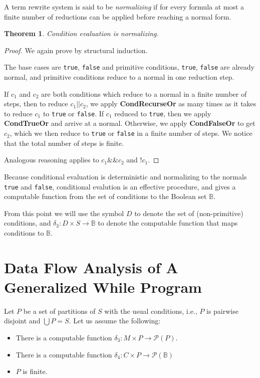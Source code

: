 \documentclass[11pt]{article}
\begin{document}
A term rewrite system is said to be \emph{normalizing} if for every formula at most a finite number of reductions can be applied before reaching a normal form.

\newtheorem*{conditionalsnormalizing}{Theorem}
\begin{conditionalsnormalizing}
Condition evaluation is normalizing.
\end{conditionalsnormalizing}

\begin{proof}
We again prove by structural induction.

The base cases are \texttt{true}, \texttt{false} and primitive conditions, \texttt{true}, \texttt{false} are already normal, and primitive conditions reduce to a normal in one reduction step.

If $c_{1}$ and $c_{2}$ are both conditions which reduce to a normal in a finite number of steps, then to reduce $c_{1}\texttt{||}c_{2}$, we apply \textbf{CondRecurseOr} as many times as it takes to reduce $c_{1}$ to \texttt{true} or \texttt{false}.  If $c_{1}$ reduced to \texttt{true}, then we apply \textbf{CondTrueOr} and arrive at a normal.  Otherwise, we apply \textbf{CondFalseOr} to get $c_{2}$, which we then reduce to \texttt{true} or \texttt{false} in a finite number of steps.  We notice that the total number of steps is finite.

Analogous reasoning applies to $c_{1}\texttt{\&\&}c_{2}$ and $\texttt{!}c_{1}$.
\end{proof}

Because conditional evaluation is deterministic and normalizing to the normals \texttt{true} and \texttt{false}, conditional evalution is an effective procedure, and gives a computable function from the set of conditions to the Boolean set $\mathbb{B}$.

From this point we will use the symbol $D$ to denote the set of (non-primitive) conditions, and $\delta_{3} : D \times S \rightarrow \mathbb{B}$ to denote the computable function that maps conditions to $\mathbb{B}$.

\section{Data Flow Analysis of A Generalized While Program}

Let $P$ be a set of partitions of $S$ with the usual conditions, i.e., $P$ is pairwise disjoint and $\bigcup P = S$.  Let us assume the following:

\begin{itemize}
\item There is a computable function $\delta_{3} : M \times P \rightarrow \mathcal{P}(P)$.
\item There is a computable function $\delta_{4} : C \times P \rightarrow \mathcal{P}(\mathbb{B})$
\item $P$ is finite.
\end{itemize}
\end{document}
